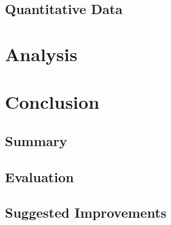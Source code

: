 \documentclass[
	letterpaper, %
	12pt, %
]{CSUniSchoolLabReport}
\begin{document}
\subsection{Quantitative Data}


\section{Analysis}


\section{Conclusion}

\subsection{Summary}

\subsection{Evaluation}

\subsection{Suggested Improvements}


\printbibliography %

\end{document}
